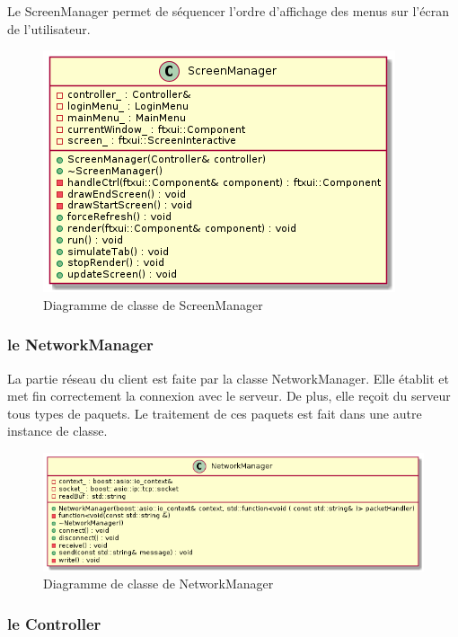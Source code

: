 \documentclass{article}
\begin{document}
Le ScreenManager permet de séquencer l'ordre d'affichage des menus sur l'écran de l'utilisateur.

\begin{figure}[H]
    \centering
    \includegraphics[scale=0.4]{../res/uml/class/ScreenManagerClass.png}
    \caption{Diagramme de classe de ScreenManager}
    \label{fig:ScreenManagerDiagram}
\end{figure}

\subsubsection{le NetworkManager}

La partie réseau du client est faite par la classe NetworkManager. Elle établit et met fin correctement la connexion avec le serveur. De plus, elle reçoit du serveur tous types de paquets. Le traitement de ces paquets est fait dans une autre instance de classe.

\begin{figure}[!ht]
	\centering
	 \includegraphics[scale=0.5]{../res/uml/class/NetworkManagerClass.png}
	 \caption{Diagramme de classe de NetworkManager}
	 \label{fig:NetworkManagerDiagram}
\end{figure}

\subsubsection{le Controller}
\end{document}
